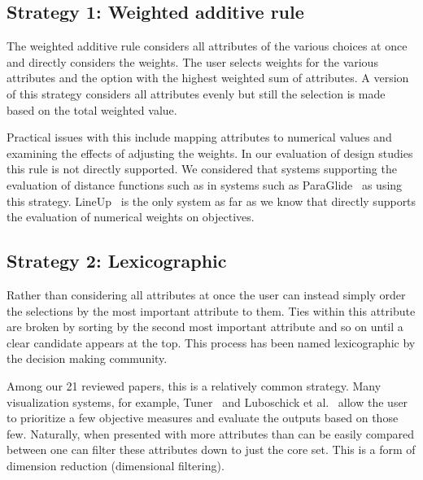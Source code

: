 
\subsection{Strategy 1: Weighted additive rule}\label{weighted-additive-rule}

The weighted additive rule considers all
attributes of the various choices at once and directly considers 
the weights. The user selects weights for the various attributes and 
the option with the highest weighted sum of attributes.
A version of this strategy considers all attributes evenly but still
the selection is made based on the total weighted value.

Practical issues with this include mapping attributes to numerical values
and examining the effects of adjusting the weights. In our evaluation of
design studies this rule is not directly supported. We considered that
systems supporting the evaluation of distance functions such as 
in systems such as ParaGlide~\citep{Bergner:2013} as using this strategy.
LineUp~\citep{Gratzl:2013} is the only system as far as we know that
directly supports the evaluation of numerical weights on objectives. 

\subsection{Strategy 2: Lexicographic}\label{lexicographic}

Rather than considering all attributes at once the user can instead simply
order the selections by the most important attribute to them. Ties within this
attribute are broken by sorting by the second most important attribute and so
on until a clear candidate appears at the top. This process has been named
lexicographic by the decision making community.

Among our 21 reviewed papers, this is a relatively common strategy.
Many visualization systems, for example, Tuner~\cite{Torsney-Weir:2011} and
Luboschick et al.~\citep{Luboschik:2014} allow the user to prioritize a few
objective measures and evaluate the outputs based on those few. Naturally,
when presented with more attributes than can be easily compared between
one can filter
these attributes down to just the core set. This is a form of dimension 
reduction (dimensional filtering).

